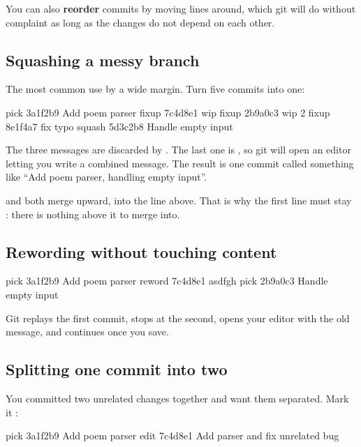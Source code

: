 \documentclass[11pt]{article}
\begin{document}
You can also \textbf{reorder} commits by moving lines around, which git will do
without complaint as long as the changes do not depend on each other.

\subsection{Squashing a messy branch}

The most common use by a wide margin. Turn five commits into one:

\begin{terminal}
pick   3a1f2b9 Add poem parser
fixup  7c4d8e1 wip
fixup  2b9a0c3 wip 2
fixup  8e1f4a7 fix typo
squash 5d3c2b8 Handle empty input
\end{terminal}

The three  messages are discarded by . The last one is
, so git will open an editor letting you write a combined message. The
result is one commit called something like ``Add poem parser, handling empty
input''.

\begin{note}
 and  both merge upward, into the line above. That is why the
first line must stay : there is nothing above it to merge into.
\end{note}

\subsection{Rewording without touching content}

\begin{terminal}
pick   3a1f2b9 Add poem parser
reword 7c4d8e1 asdfgh
pick   2b9a0c3 Handle empty input
\end{terminal}

Git replays the first commit, stops at the second, opens your editor with the old
message, and continues once you save.

\subsection{Splitting one commit into two}

You committed two unrelated changes together and want them separated. Mark it
:

\begin{terminal}
pick 3a1f2b9 Add poem parser
edit 7c4d8e1 Add parser and fix unrelated bug
\end{terminal}
\end{document}

